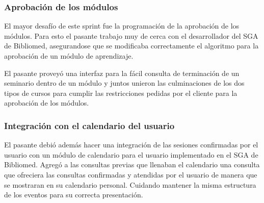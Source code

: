 \subsubsection{Aprobación de los módulos}

El mayor desafío de este sprint fue la programación de la aprobación de los módulos. Para esto el pasante trabajo muy de cerca con el desarrollador del SGA de Bibliomed, asegurandose que se modificaba correctamente el algoritmo para la aprobación de un módulo de aprendizaje.

El pasante proveyó una interfaz para la fácil consulta de terminación de un seminario dentro de un módulo y juntos unieron las culminaciones de los dos tipos de cursos para cumplir las restricciones pedidas por el cliente para la aprobación de los módulos.

\subsubsection{Integración con el calendario del usuario}

El pasante debió además hacer una integración de las sesiones confirmadas por el usuario con un módulo de calendario para el usuario implementado en el SGA de Bibliomed. Agregó a las consultas previas que llenaban el calendario una consulta que ofreciera las consultas confirmadas y atendidas por el usuario de manera que se mostraran en su calendario personal. Cuidando mantener la misma estructura de los eventos para su correcta presentación.

